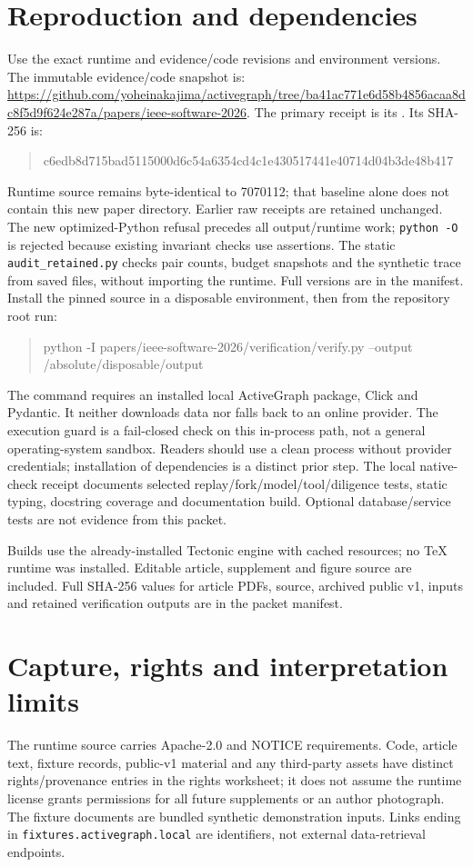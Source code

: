\documentclass[11pt]{article}
\begin{document}
\section*{Reproduction and dependencies}
Use the exact runtime and evidence/code revisions and environment versions. The immutable evidence/code snapshot is:
\url{https://github.com/yoheinakajima/activegraph/tree/ba41ac771e6d58b4856acaa8dc8f5d9f624e287a/papers/ieee-software-2026}.
The primary receipt is its . Its SHA-256 is:
\begin{quote}\ttfamily\small
c6edb8d715bad5115000d6c54a6354cd4c1e430517441e40714d04b3de48b417
\end{quote} Runtime source remains byte-identical to 7070112; that baseline alone does not contain this new paper directory. Earlier raw receipts are retained unchanged. The new optimized-Python refusal precedes all output/runtime work; \texttt{python -O} is rejected because existing invariant checks use assertions. The static \texttt{audit\_retained.py} checks pair counts, budget snapshots and the synthetic trace from saved files, without importing the runtime. Full versions are in the manifest. Install the pinned source in a disposable environment, then from the repository root run:
\begin{quote}\ttfamily\small
python -I papers/ieee-software-2026/verification/verify.py\linebreak
\hspace*{1em}--output /absolute/disposable/output
\end{quote}
The command requires an installed local ActiveGraph package, Click and Pydantic. It neither downloads data nor falls back to an online provider. The execution guard is a fail-closed check on this in-process path, not a general operating-system sandbox. Readers should use a clean process without provider credentials; installation of dependencies is a distinct prior step. The local native-check receipt documents selected replay/fork/model/tool/diligence tests, static typing, docstring coverage and documentation build. Optional database/service tests are not evidence from this packet.

Builds use the already-installed Tectonic engine with cached resources; no TeX runtime was installed. Editable article, supplement and figure source are included. Full SHA-256 values for article PDFs, source, archived public v1, inputs and retained verification outputs are in the packet manifest.

\section*{Capture, rights and interpretation limits}
The runtime source carries Apache-2.0 and NOTICE requirements. Code, article text, fixture records, public-v1 material and any third-party assets have distinct rights/provenance entries in the rights worksheet; it does not assume the runtime license grants permissions for all future supplements or an author photograph. The fixture documents are bundled synthetic demonstration inputs. Links ending in \texttt{fixtures.activegraph.local} are identifiers, not external data-retrieval endpoints.
\end{document}
